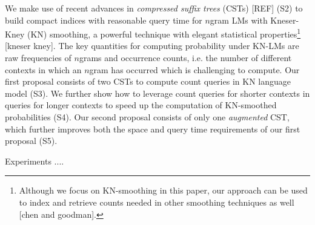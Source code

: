 %
%
%
%
 
We make use of recent advances in 
\emph{compressed suffix trees} (CSTs) [REF] (S2) to build compact indices  
with reasonable query time for $n$gram LMs with Kneser-Kney (KN) smoothing,  
a powerful technique with elegant statistical properties\footnote{Although
we focus on KN-smoothing in this paper, our approach can be used to index and retrieve
counts needed in other smoothing techniques as well [chen and goodman].}  [kneser kney].
%
The key quantities for computing probability under KN-LMs
are raw frequencies of $n$grams 
and occurrence counts, i.e. the number of different contexts in which an $n$gram has 
occurred which is challenging to compute.
%
%
Our first proposal consists of two CSTs to compute count queries 
in KN language model (S3). 
% 
We further show how to leverage count queries for shorter contexts in queries for 
longer contexts to speed up the computation of KN-smoothed probabilities (S4).
%
Our second proposal consists of only one \emph{augmented} CST, which 
further improves both the space and query time requirements of our first proposal (S5). 
% 

Experiments ....


